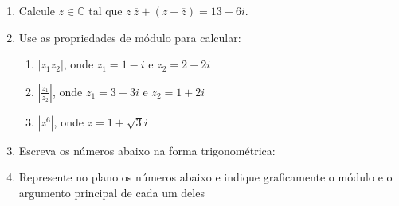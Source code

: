 \documentclass[a4paper,5pt]{amsbook}
\newcommand{\ds}{\displaystyle}
\begin{document}
\begin{enumerate}
	\vspace{0.5cm}
	\item Calcule $z\in\mathbb{C}$ tal que $z\ \overline{z} +
		(z-\overline{z})=13+6i$.

	\vspace{0.5cm}
	\item Use as propriedades de m\'odulo para calcular:
		\begin{enumerate}
			\vspace{0.3cm}
			\item $|z_1z_2|$, onde $z_1=1-i$ e $z_2=2+2i$
			\vspace{0.3cm}
			\item $\ds\left|\frac{z_1}{z_2}\right|$, onde $z_1=3+3i$ e
				$z_2=1+2i$
			\vspace{0.3cm}
			\item $|z^6|$, onde $z=1+\sqrt{3}i$
		\end{enumerate}

	\vspace{0.5cm}
	\item Escreva os n\'umeros abaixo na forma trigonom\'etrica:


	\vspace{0.5cm}
	\item Represente no plano os n\'umeros abaixo e indique graficamente o m\'odulo
		e o argumento principal de cada um deles



\end{enumerate}
\end{document}
